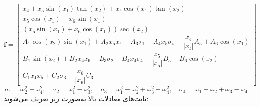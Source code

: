 \begin{equation}
\boldsymbol f = \begin{bmatrix}
		x_4 + x_5\sin(x_1)\tan(x_2) + x_6\cos(x_1)\tan(x_2)\\
		x_5\cos(x_1)- x_6\sin(x_1)\\
		(x_5\sin(x_1) + x_6\cos(x_1))\sec(x_2)\\
		A_1\cos(x_2)\sin(x_1) + 
		A_2x_5x_6 + A_3\sigma_1+
		A_4x_5\sigma_4- \dfrac{x_4}{\lvert x_4\rvert}A_5+A_6\cos(x_1)\\
		B_1\sin(x_2) + 
		B_2x_4x_6 + B_3\sigma_2+
		B_4x_4\sigma_4- \dfrac{x_5}{\lvert x_5\rvert}B_5 + B_6\cos(x_2)\\
		C_1x_4x_5 + 
		C_2\sigma_3- \dfrac{x_6}{\lvert x_6\rvert}C_3
	\end{bmatrix}
\end{equation} 
\begin{equation*}
	\sigma_1 = \omega_2^2-\omega_4^2,\quad \sigma_2 = \omega_1^2-\omega_3^2,
	\quad \sigma_3 = \omega_1^2-\omega_2^2+\omega_3^2-\omega_4^2,\quad \sigma_4 = \omega_1-\omega_2+\omega_3-\omega_4
\end{equation*}
ثابت‌های معادلات بالا  به‌صورت زیر تعریف می‌شوند:
